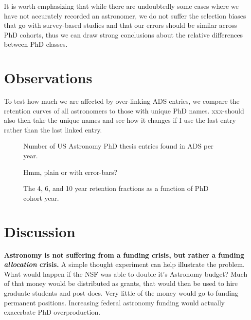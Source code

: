 \documentclass{emulateapj}
\begin{document}
\begin{figure}
  \caption{\label{fig:unames}}
  \end{figure}


It is worth emphasizing that while there are undoubtedly some cases where we have not accurately recorded an astronomer, we do not suffer the selection biases that go with survey-based studies and that our errors should be similar across PhD cohorts, thus we can draw strong conclusions about the relative differences between PhD classes.

\section{Observations}

To test how much we are affected by over-linking ADS entries, we compare the retention curves of all astronomers to those with unique PhD names.  xxx-should also then take the unique names and see how it changes if I use the last entry rather than the last linked entry.


\begin{figure}
  \caption{Number of US Astronomy PhD thesis entries found in ADS per year. \label{fig:phdperyear}}
\end{figure}

\begin{figure}
  \caption{ Hmm, plain or with error-bars? \label{fig:active_curves}}
  \end{figure}


\begin{figure}
  \caption{The 4, 6, and 10 year retention fractions as a function of PhD cohort year.\label{fig:retention}}
\end{figure}


\section{Discussion}

{\bf{Astronomy is not suffering from a funding crisis, but rather a funding {\emph{allocation}} crisis.}} A simple thought experiment can help illustrate the problem. What would happen if the NSF was able to double it's Astronomy budget? Much of that money would be distributed as grants, that would then be used to hire graduate students and post docs. Very little of the money would go to funding permanent positions. Increasing federal astronomy funding would actually exacerbate PhD overproduction. 
\end{document}

